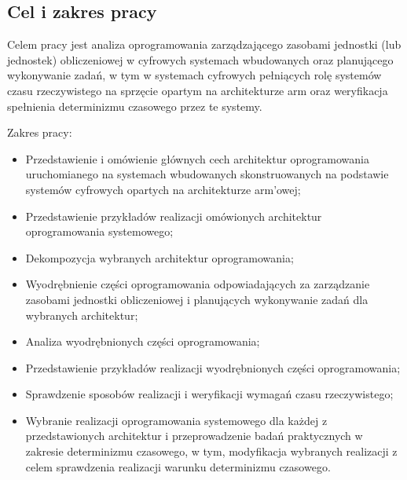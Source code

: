 \documentclass[../../main]{subfiles}
\begin{document}
\subsection{Cel i zakres pracy}

Celem pracy jest analiza oprogramowania zarządzającego zasobami jednostki (lub jednostek) obliczeniowej w cyfrowych systemach wbudowanych oraz planującego wykonywanie zadań, w tym w systemach cyfrowych pełniących rolę systemów czasu rzeczywistego na sprzęcie opartym na architekturze \gls{arm} oraz weryfikacja spełnienia determinizmu czasowego przez te systemy.

Zakres pracy:

\begin{itemize}
    \item Przedstawienie i omówienie głównych cech architektur oprogramowania uruchomianego na systemach wbudowanych skonstruowanych na podstawie systemów cyfrowych opartych na architekturze \gls{arm}'owej;
    \item Przedstawienie przykładów realizacji omówionych architektur oprogramowania systemowego;
    \item Dekompozycja wybranych architektur oprogramowania;
    \item Wyodrębnienie części oprogramowania odpowiadających za zarządzanie zasobami jednostki obliczeniowej i planujących wykonywanie zadań dla wybranych architektur;
    \item Analiza wyodrębnionych części oprogramowania;
    \item Przedstawienie przykładów realizacji wyodrębnionych części oprogramowania;
    \item Sprawdzenie sposobów realizacji i weryfikacji wymagań czasu rzeczywistego;
    \item Wybranie realizacji oprogramowania systemowego dla każdej z przedstawionych architektur i przeprowadzenie badań praktycznych w zakresie determinizmu czasowego, w tym, modyfikacja wybranych realizacji z celem sprawdzenia realizacji warunku determinizmu czasowego.
\end{itemize}
\end{document}
